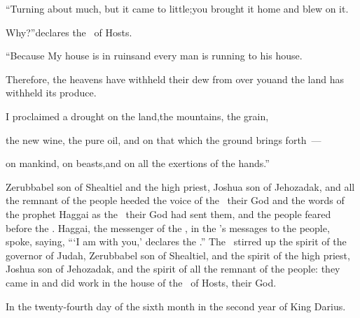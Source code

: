 \begin{inparaenum}
  \pc{} ``Turning about much, but it came to little;\pa{}you brought it home and blew on it.%

  \pd{}Why?''\pa{}declares the \lord\ of Hosts.%

  \pd{}``Because My house is in ruins\pa{}and every man is running to his house.%

  \pc{} Therefore, the heavens have withheld their dew from over you\pa{}and the land has withheld its produce.%

  \pc{} I proclaimed a drought on the land,\pa{}the mountains, the grain,%

  \pd{}the new wine,%
  the pure oil,%
  \pa{}and on%
  that which the ground brings forth~---%

  \pd{}on mankind, on beasts,\pa{}and on all the exertions of the hands.''\bigskip%

   Zerubbabel son of Shealtiel and the high priest, Joshua son of Jehozadak, and all the remnant of the people heeded the voice of the \lord\ their God and the words of the prophet Haggai as the \lord\ their God had sent them, and the people feared before the \lord.%
   Haggai, the messenger of the \lord, in the \lord's messages to the people, spoke, saying,\hspace*{2em} ``\thinspace`I am with you,' declares the \lord.''%
   The \lord\ stirred up the spirit of the governor of Judah, Zerubbabel son of Shealtiel, and the spirit of the high priest, Joshua son of Jehozadak, and the spirit of all the remnant of the people: they came in and did work in the house of the \lord\ of Hosts, their God.\smallskip%

  \pc{} In the twenty-fourth day of the sixth month in the second year of King Darius.%
\end{inparaenum}
